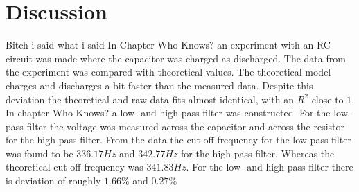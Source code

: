 \chapter{Discussion}
Bitch i said what i said
In Chapter Who Knows? an experiment with an RC circuit was made where the capacitor was charged as discharged. The data from the experiment was compared with theoretical values. The theoretical model charges and discharges a bit faster than the measured data. Despite this deviation the theoretical and raw data fits almost identical, with an $R^2$ close to $1$. 
\\
In chapter Who Knows? a low- and high-pass filter was constructed. For the low-pass filter the voltage was measured across the capacitor and across the resistor for the high-pass filter. From the data the cut-off frequency for the low-pass filter was found to be $336.17 Hz$ and $342.77 Hz$ for the high-pass filter. Whereas the theoretical cut-off frequency was $341.83 Hz$. For the low- and high-pass filter there is deviation of roughly $1.66 \% $ and $0.27 \% $ 
